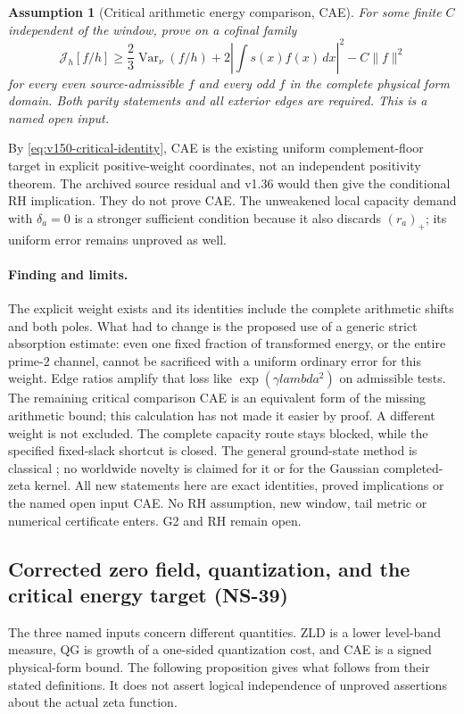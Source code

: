\documentclass[11pt]{article}
\def\lambda{lambda}%
\newtheorem{assumption}[theorem]{Assumption}
\theoremstyle{remark}
\begin{document}
\begin{assumption}[Critical arithmetic energy comparison, CAE]
\label{ass:v150-cae}
For some finite $C$ independent of the window, prove on a cofinal family
\begin{equation}\label{eq:v150-cae}
 \mathcal J_h[f/h]\ge
 \frac23\operatorname{Var}_{\nu}(f/h)
       +2\left|\int s(x)f(x)\,dx\right|^2-C\|f\|^2
\end{equation}
for every even source-admissible $f$ and every odd $f$ in the complete
physical form domain. Both parity statements and all exterior edges
are required. This is a named open input.
\end{assumption}
By \eqref{eq:v150-critical-identity}, CAE is the existing uniform
complement-floor target in explicit positive-weight coordinates, not
an independent positivity theorem. The archived source residual and
v1.36 would then give the conditional RH implication. They do not
prove CAE. The unweakened local capacity demand with $\delta_a=0$
is a stronger sufficient condition because it also discards $(r_a)_+$;
its uniform error remains unproved as well.

\paragraph{Finding and limits.}
The explicit weight exists and its identities include the complete
arithmetic shifts and both poles. What had to change is the proposed
use of a generic strict absorption estimate: even one fixed fraction
of transformed energy, or the entire prime-$2$ channel, cannot be
sacrificed with a uniform ordinary error for this weight. Edge ratios
amplify that loss like $\exp(\gamma\lambda^2)$ on admissible tests.
The remaining critical comparison CAE is an equivalent form of the
missing arithmetic bound; this calculation has not made it easier
by proof. A different weight is not excluded. The complete capacity
route stays blocked, while the specified fixed-slack shortcut is closed.
The general ground-state method is classical
\cite{FrankSeiringer2008}; no worldwide novelty is claimed for it or
for the Gaussian completed-zeta kernel. All new statements here are
exact identities, proved implications or the named open input CAE.
No RH assumption, new window, tail metric or numerical certificate
enters. G2 and RH remain open.

\subsection{Corrected zero field, quantization, and the critical energy target (NS-39)}
\label{sec:v151-input-comparison}
The three named inputs concern different quantities. ZLD is a lower
level-band measure, QG is growth of a one-sided quantization cost, and
CAE is a signed physical-form bound. The following proposition gives
what follows from their stated definitions. It does not assert logical
independence of unproved assertions about the actual zeta function.
\end{document}
